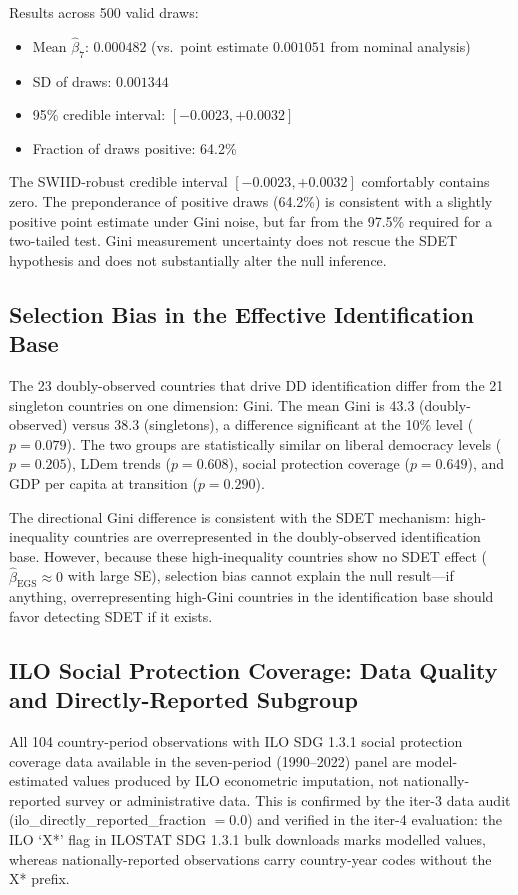 \documentclass[11pt,letterpaper]{article}
\begin{document}
Results across 500 valid draws:
\begin{itemize}
  \item Mean $\hat{\beta}_7$: $0.000482$ (vs.\ point estimate $0.001051$ from nominal analysis)
  \item SD of draws: $0.001344$
  \item 95\% credible interval: $[-0.0023, +0.0032]$
  \item Fraction of draws positive: 64.2\%
\end{itemize}

The SWIID-robust credible interval $[-0.0023, +0.0032]$ comfortably contains zero. The preponderance
of positive draws (64.2\%) is consistent with a slightly positive point estimate under Gini noise,
but far from the 97.5\% required for a two-tailed test. Gini measurement uncertainty does not
rescue the SDET hypothesis and does not substantially alter the null inference.

\subsection{Selection Bias in the Effective Identification Base}

The 23 doubly-observed countries that drive DD identification differ from the 21 singleton countries
on one dimension: Gini. The mean Gini is 43.3 (doubly-observed) versus 38.3 (singletons), a
difference significant at the 10\% level ($p = 0.079$). The two groups are statistically similar
on liberal democracy levels ($p = 0.205$), LDem trends ($p = 0.608$), social protection coverage
($p = 0.649$), and GDP per capita at transition ($p = 0.290$).

The directional Gini difference is consistent with the SDET mechanism: high-inequality countries
are overrepresented in the doubly-observed identification base. However, because these
high-inequality countries show no SDET effect ($\hat{\beta}_\text{EGS} \approx 0$ with large SE),
selection bias cannot explain the null result---if anything, overrepresenting high-Gini countries
in the identification base should favor detecting SDET if it exists.

\subsection{ILO Social Protection Coverage: Data Quality and Directly-Reported Subgroup}
\label{subsec:ilodata}

All 104 country-period observations with ILO SDG 1.3.1 social protection coverage data available
in the seven-period (1990--2022) panel are model-estimated values produced by ILO econometric
imputation, not nationally-reported survey or administrative data. This is confirmed by the iter-3
data audit (ilo\_directly\_reported\_fraction $= 0.0$) and verified in the iter-4 evaluation: the
ILO `X*' flag in ILOSTAT SDG 1.3.1 bulk downloads marks modelled values, whereas
nationally-reported observations carry country-year codes without the X* prefix.
\end{document}
